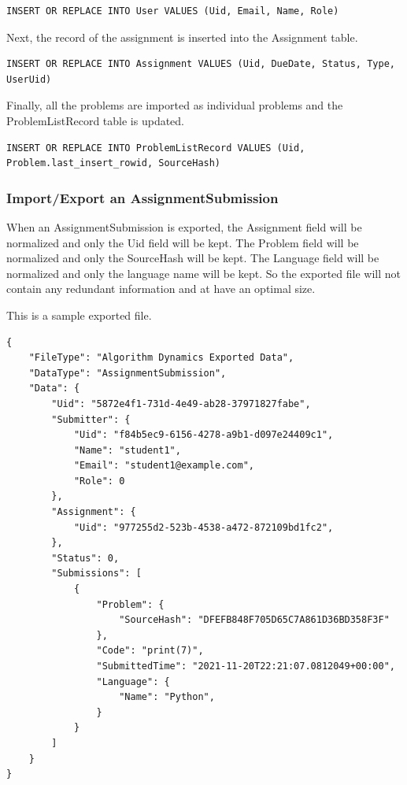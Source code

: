 \documentclass[a4paper]{report}
\begin{document}
\begin{verbatim}
INSERT OR REPLACE INTO User VALUES (Uid, Email, Name, Role)
\end{verbatim}

Next, the record of the assignment is inserted into the Assignment table.

\begin{verbatim}
INSERT OR REPLACE INTO Assignment VALUES (Uid, DueDate, Status, Type, UserUid)
\end{verbatim}

Finally, all the problems are imported as individual problems and the ProblemListRecord table is updated.

\begin{verbatim}
INSERT OR REPLACE INTO ProblemListRecord VALUES (Uid, Problem.last_insert_rowid, SourceHash)
\end{verbatim}

\subsubsection{Import/Export an AssignmentSubmission}

When an AssignmentSubmission is exported, the Assignment field will be normalized and only the Uid field will be kept. The Problem field will be normalized and only the SourceHash will be kept. The Language field will be normalized and only the language name will be kept. So the exported file will not contain any redundant information and at have an optimal size.

This is a sample exported file.

\begin{verbatim}
{
    "FileType": "Algorithm Dynamics Exported Data",
    "DataType": "AssignmentSubmission",
    "Data": {
        "Uid": "5872e4f1-731d-4e49-ab28-37971827fabe",
        "Submitter": {
            "Uid": "f84b5ec9-6156-4278-a9b1-d097e24409c1",
            "Name": "student1",
            "Email": "student1@example.com",
            "Role": 0
        },
        "Assignment": {
            "Uid": "977255d2-523b-4538-a472-872109bd1fc2",
        },
        "Status": 0,
        "Submissions": [
            {
                "Problem": {
                    "SourceHash": "DFEFB848F705D65C7A861D36BD358F3F"
                },
                "Code": "print(7)",
                "SubmittedTime": "2021-11-20T22:21:07.0812049+00:00",
                "Language": {
                    "Name": "Python",
                }
            }
        ]
    }
}
\end{verbatim}
\end{document}
